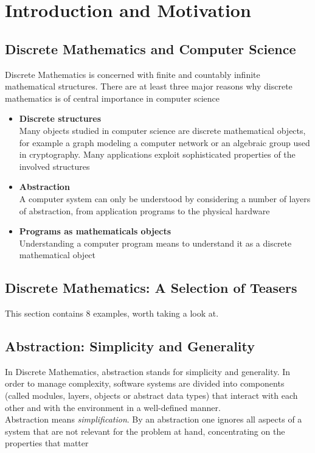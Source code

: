 \documentclass[a4paper]{report}
\begin{document}
\tableofcontents
\chapter{Introduction and Motivation}
\section{Discrete Mathematics and Computer Science}
Discrete Mathematics is concerned with finite and countably infinite mathematical structures. There are at least three major reasons why discrete mathematics is of central importance in computer science
\begin{itemize}
\item\textbf{Discrete structures}\\
Many objects studied in computer science are discrete mathematical objects, for example a graph modeling a computer network or an algebraic group used in cryptography. Many applications exploit sophisticated properties of the involved structures
\item\textbf{Abstraction}\\
A computer system can only be understood by considering a number of layers of abstraction, from application programs to the physical hardware
\item\textbf{Programs as mathematicals objects}\\
Understanding a computer program means to understand it as a discrete mathematical object
\end{itemize}
\section{Discrete Mathematics: A Selection of Teasers}
This section contains 8 examples, worth taking a look at.
\section{Abstraction: Simplicity and Generality}
In Discrete Mathematics, abstraction stands for simplicity and generality. In order to manage complexity, software systems are divided into components (called modules, layers, objects or abstract data types) that interact with each other and with the environment in a well-defined manner. \\

Abstraction means \emph{simplification}. By an abstraction one ignores all aspects of a system that are not relevant for the problem at hand, concentrating on the properties that matter\\
\end{document}
